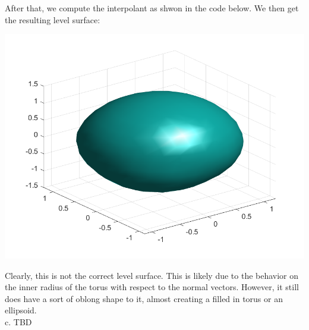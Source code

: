\begin{solution}
    After that, we compute the interpolant as shwon in the code below. We then get the resulting level
    surface:

    \begin{center}
        \includegraphics[scale=0.5]{problem2blvl0.PNG}
    \end{center}

    Clearly, this is not the correct level surface. This is likely due to the behavior on the inner
    radius of the torus with respect to the normal vectors. However, it still does have a sort of
    oblong shape to it, almost creating a filled in torus or an ellipsoid.\\

    c. TBD

\end{solution}

\newpage

\newpage
